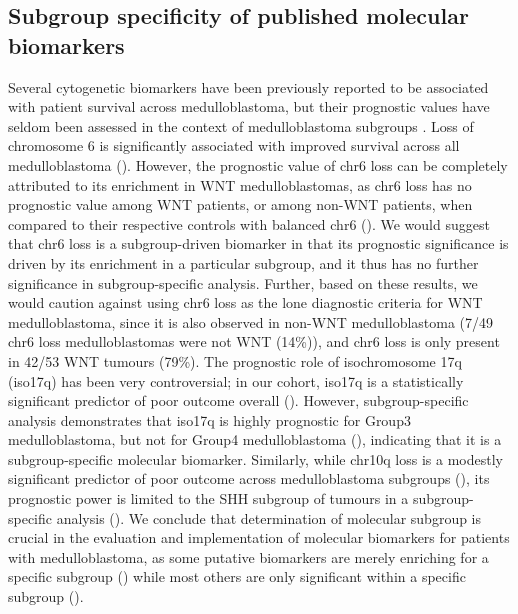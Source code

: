 \clearpage

\subsection{Subgroup specificity of published molecular biomarkers}

Several cytogenetic biomarkers have been previously reported to be associated with patient survival across medulloblastoma, but their prognostic values have seldom been assessed in the context of medulloblastoma subgroups . Loss of chromosome 6 is significantly associated with improved survival across all medulloblastoma (). However, the prognostic value of chr6 loss can be completely attributed to its enrichment in WNT medulloblastomas, as chr6 loss has no prognostic value among WNT patients, or among non-WNT patients, when compared to their respective controls with balanced chr6 (). We would suggest that chr6 loss is a subgroup-driven biomarker in that its prognostic significance is driven by its enrichment in a particular subgroup, and it thus has no further significance in subgroup-specific analysis. Further, based on these results, we would caution against using chr6 loss as the lone diagnostic criteria for WNT medulloblastoma, since it is also observed in non-WNT medulloblastoma (7/49 chr6 loss medulloblastomas were not WNT (14\%)), and chr6 loss is only present in 42/53 WNT tumours (79\%). The prognostic role of isochromosome 17q (iso17q) has been very controversial; in our cohort, iso17q is a statistically significant predictor of poor outcome overall (). However, subgroup-specific analysis demonstrates that iso17q is highly prognostic for Group3 medulloblastoma, but not for Group4 medulloblastoma (), indicating that it is a subgroup-specific molecular biomarker. Similarly, while chr10q loss is a modestly significant predictor of poor outcome across medulloblastoma subgroups (), its prognostic power is limited to the SHH subgroup of tumours in a subgroup-specific analysis (). We conclude that determination of molecular subgroup is crucial in the evaluation and implementation of molecular biomarkers for patients with medulloblastoma, as some putative biomarkers are merely enriching for a specific subgroup () while most others are only significant within a specific subgroup ().

